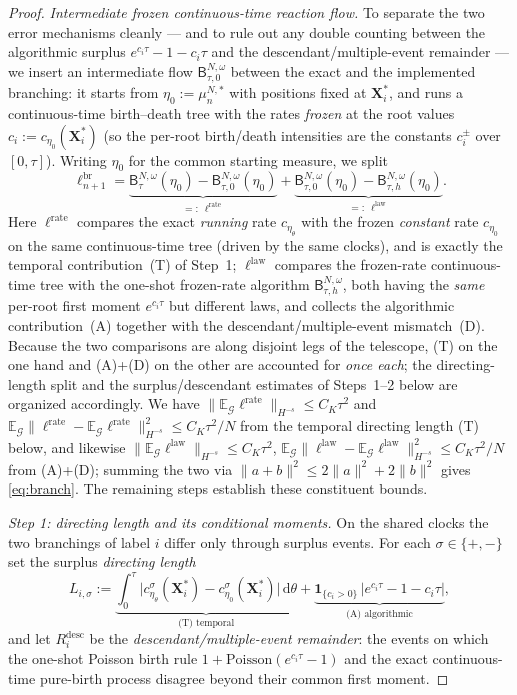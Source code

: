 \documentclass[a4paper,fleqn]{cas-sc}
\theoremstyle{definition}
\theoremstyle{remark}
\begin{document}
\begin{proof}
\emph{Intermediate frozen continuous-time reaction flow.} To separate the two error
mechanisms cleanly --- and to rule out any double counting between the algorithmic
surplus $e^{c_i\tau}-1-c_i\tau$ and the descendant/multiple-event remainder --- we
insert an intermediate flow $\mathsf B^{N,\omega}_{\tau,0}$ between the exact and the
implemented branching: it starts from $\eta_0:=\mu^{N,*}_n$ with positions fixed at
$\mathbf X^*_i$, and runs a continuous-time birth--death tree with the rates
\emph{frozen} at the root values $c_i:=c_{\eta_0}(\mathbf X^*_i)$ (so the per-root
birth/death intensities are the constants $c^\pm_i$ over $[0,\tau]$). Writing
$\eta_0$ for the common starting measure, we split
\[
\ell^{\mathrm{br}}_{n+1}
=\underbrace{\mathsf B^{N,\omega}_\tau(\eta_0)-\mathsf B^{N,\omega}_{\tau,0}(\eta_0)}_{=:\ \ell^{\mathrm{rate}}}
+\underbrace{\mathsf B^{N,\omega}_{\tau,0}(\eta_0)-\mathsf B^{N,\omega}_{\tau,h}(\eta_0)}_{=:\ \ell^{\mathrm{law}}}.
\]
Here $\ell^{\mathrm{rate}}$ compares the exact \emph{running} rate $c_{\eta_\theta}$ with
the frozen \emph{constant} rate $c_{\eta_0}$ on the same continuous-time tree (driven by
the same clocks), and is exactly the temporal contribution~(T) of Step~1; $\ell^{\mathrm{law}}$
compares the frozen-rate continuous-time tree with the one-shot frozen-rate algorithm
$\mathsf B^{N,\omega}_{\tau,h}$, both having the \emph{same} per-root first moment
$e^{c_i\tau}$ but different laws, and collects the algorithmic contribution~(A)
together with the descendant/multiple-event mismatch~(D). Because the two
comparisons are along disjoint legs of the telescope, (T) on the one hand and (A)+(D)
on the other are accounted for \emph{once each}; the directing-length split and the
surplus/descendant estimates of Steps~1--2 below are organized accordingly. We have
$\|\mathbb E_{\mathcal G}\ell^{\mathrm{rate}}\|_{H^{-s}}\le C_K\tau^2$ and
$\mathbb E_{\mathcal G}\|\ell^{\mathrm{rate}}-\mathbb E_{\mathcal G}\ell^{\mathrm{rate}}\|_{H^{-s}}^2\le C_K\tau^2/N$
from the temporal directing length (T) below, and likewise
$\|\mathbb E_{\mathcal G}\ell^{\mathrm{law}}\|_{H^{-s}}\le C_K\tau^2$,
$\mathbb E_{\mathcal G}\|\ell^{\mathrm{law}}-\mathbb E_{\mathcal G}\ell^{\mathrm{law}}\|_{H^{-s}}^2\le C_K\tau^2/N$
from (A)+(D); summing the two via $\|a+b\|^2\le2\|a\|^2+2\|b\|^2$ gives
\eqref{eq:branch}. The remaining steps establish these constituent bounds.

\emph{Step 1: directing length and its conditional moments.} On the shared clocks
the two branchings of label $i$ differ only through surplus events. For each
$\sigma\in\{+,-\}$ set the surplus \emph{directing length}
\[
L_{i,\sigma}:=\underbrace{\int_0^\tau\bigl|c^\sigma_{\eta_\theta}(\mathbf X^*_i)
-c^\sigma_{\eta_0}(\mathbf X^*_i)\bigr|\,\mathrm d\theta}_{\text{(T) temporal}}
+\underbrace{\mathbf 1_{\{c_i>0\}}\,\bigl|e^{c_i\tau}-1-c_i\tau\bigr|}_{\text{(A) algorithmic}},
\]
and let $R^{\mathrm{desc}}_i$ be the \emph{descendant/multiple-event remainder}: the
events on which the one-shot Poisson birth rule $1+\mathrm{Poisson}(e^{c_i\tau}-1)$
and the exact continuous-time pure-birth process disagree beyond their common
first moment.


\end{proof}
\end{document}
